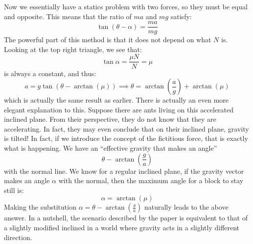 \documentclass{article}
\begin{document}
Now we essentially have a statics problem with two forces, so they must be equal and opposite. This means that the ratio of $ma$ and $mg$ satisfy:
\begin{equation}
    \tan(\theta-\alpha) = \frac{ma}{mg}
    \label{eq:}
\end{equation}
The powerful part of this method is that it does not depend on what $N$ is. Looking at the top right triangle, we see that:
\begin{equation}
    \tan\alpha = \frac{\mu N}{N} = \mu
    \label{eq:}
\end{equation}
is always a constant, and thus:
\begin{equation}
    a = g\tan(\theta-\arctan(\mu)) \implies \theta = \arctan\left(\frac{a}{g}\right)+\arctan(\mu)
    \label{eq:}
\end{equation}
which is actually the same result as earlier. There is actually an even more elegant explanation to this. Suppose there are ants living on this accelerated inclined plane. From their perspective, they do not know that they are accelerating. In fact, they may even conclude that on their inclined plane, gravity is tilted! In fact, if we introduce the concept of the fictitious force, that is exactly what is happening. We have an ``effective gravity that makes an angle''
\begin{equation}
    \theta - \arctan\left(\frac{g}{a}\right)
    \label{eq:}
\end{equation}
 with the normal line. We know for a regular inclined plane, if the gravity vector makes an angle $\alpha$ with the normal, then the maximum angle for a block to stay still is:
 \begin{equation}
     \alpha = \arctan(\mu)
     \label{eq:}
 \end{equation}
 Making the substitution $\alpha = \theta -\arctan\left(\frac{g}{a}\right)$ naturally leads to the above answer. In a nutshell, the scenario described by the paper is equivalent to that of a slightly modified inclined in a world where gravity acts in a slightly different direction.
\end{document}
